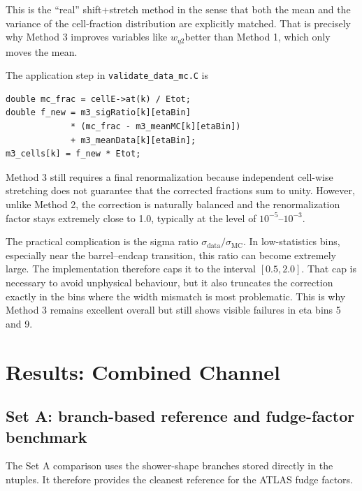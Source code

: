 \documentclass[11pt,a4paper]{article}
\newcommand{\weta}{\ensuremath{w_{\eta 2}}}
\begin{document}
This is the ``real'' shift+stretch method in the sense that both the mean and
the variance of the cell-fraction distribution are explicitly matched. That is
precisely why Method 3 improves variables like \weta better than Method 1,
which only moves the mean.

The application step in \texttt{validate\_data\_mc.C} is

\begin{lstlisting}
double mc_frac = cellE->at(k) / Etot;
double f_new = m3_sigRatio[k][etaBin]
             * (mc_frac - m3_meanMC[k][etaBin])
             + m3_meanData[k][etaBin];
m3_cells[k] = f_new * Etot;
\end{lstlisting}

Method 3 still requires a final renormalization because independent cell-wise
stretching does not guarantee that the corrected fractions sum to unity.
However, unlike Method 2, the correction is naturally balanced and the
renormalization factor stays extremely close to 1.0, typically at the level of
$10^{-5}$--$10^{-3}$.

The practical complication is the sigma ratio
$\sigma_{\mathrm{data}} / \sigma_{\mathrm{MC}}$. In low-statistics bins,
especially near the barrel--endcap transition, this ratio can become extremely
large. The implementation therefore caps it to the interval $[0.5, 2.0]$.
That cap is necessary to avoid unphysical behaviour, but it also truncates the
correction exactly in the bins where the width mismatch is most problematic.
This is why Method 3 remains excellent overall but still shows visible failures
in eta bins 5 and 9.

\section{Results: Combined Channel}

\subsection{Set A: branch-based reference and fudge-factor benchmark}

The Set A comparison uses the shower-shape branches stored directly in the
ntuples. It therefore provides the cleanest reference for the ATLAS fudge
factors.
\end{document}
